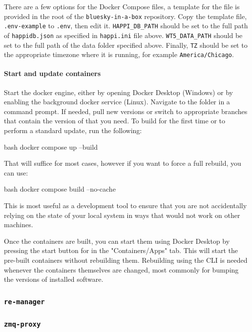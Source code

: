 There are a few options for the Docker Compose files, a template for the file is provided in the root of the \texttt{bluesky-in-a-box} repository.
Copy the template file, \nolinkurl{.env-example} to \nolinkurl{.env}, then edit it.
\texttt{HAPPI\_DB\_PATH} should be set to the full path of \nolinkurl{happidb.json} as specified in \nolinkurl{happi.ini} file above.
\texttt{WT5\_DATA\_PATH} should be set to the full path of the data folder specified above.
Finally, \texttt{TZ} should be set to the appropriate timezone where it is running, for example \texttt{America/Chicago}.


\paragraph{Start and update containers}
Start the docker engine, either by opening Docker Desktop (Windows) or by enabling the background docker service (Linux).
Navigate to the \biab folder in a command prompt.
If needed, pull new versions or switch to appropriate branches that contain the version of \biab that you need.
To build for the first time or to perform a standard update, run the following:

\begin{codefragment}{bash}
docker compose up --build
\end{codefragment}

That will suffice for most cases, however if you want to force a full rebuild, you can use:

\begin{codefragment}{bash}
docker compose build --no-cache
\end{codefragment}

This is most useful as a development tool to ensure that you are not accidentally relying on the state of your local system in ways that would not work on other machines.

Once the containers are built, you can start them using Docker Desktop by pressing the start button for \biab in the "Containers/Apps" tab.
This will start the pre-built containers without rebuilding them.
Rebuilding using the CLI is needed whenever the containers themselves are changed, most commonly for bumping the versions of installed software.

\subsubsection{\texttt{re-manager}}
\subsubsection{\texttt{zmq-proxy}}
